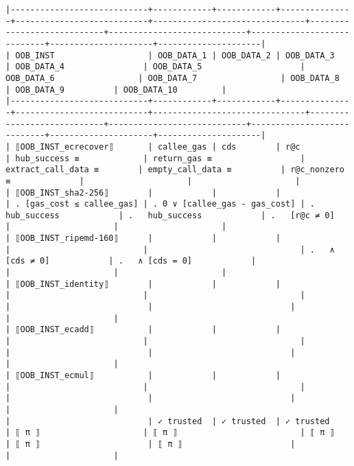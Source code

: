 \documentclass[varwidth=\maxdimen,margin=0.5cm,multi={verbatim}]{standalone}
\begin{document}
\begin{verbatim}
|----------------------------+------------+------------+---------------+---------------------------+-------------------------------+----------------------------+----------------------------+----------------------------+---------------------+---------------------|
| OOB_INST                   | OOB_DATA_1 | OOB_DATA_2 | OOB_DATA_3    | OOB_DATA_4                | OOB_DATA_5                    | OOB_DATA_6                 | OOB_DATA_7                 | OOB_DATA_8                 | OOB_DATA_9          | OOB_DATA_10         |
|----------------------------+------------+------------+---------------+---------------------------+-------------------------------+----------------------------+----------------------------+----------------------------+---------------------+---------------------|
| ⟦OOB_INST_ecrecover⟧       | callee_gas | cds        | r@c           | hub_success ≡             | return_gas ≡                  | extract_call_data ≡        | empty_call_data ≡          | r@c_nonzero ≡              |                     |                     |
| ⟦OOB_INST_sha2-256⟧        |            |            |               | . [gas_cost ≤ callee_gas] | . 0 ∨ [callee_gas - gas_cost] | .   hub_success            | .   hub_success            | .   [r@c ≠ 0]              |                     |                     |
| ⟦OOB_INST_ripemd-160⟧      |            |            |               |                           |                               | .   ∧ [cds ≠ 0]            | .   ∧ [cds = 0]            |                            |                     |                     |
| ⟦OOB_INST_identity⟧        |            |            |               |                           |                               |                            |                            |                            |                     |                     |
| ⟦OOB_INST_ecadd⟧           |            |            |               |                           |                               |                            |                            |                            |                     |                     |
| ⟦OOB_INST_ecmul⟧           |            |            |               |                           |                               |                            |                            |                            |                     |                     |
|                            | ✓ trusted  | ✓ trusted  | ✓ trusted     | ⟦ π ⟧                     | ⟦ π ⟧                         | ⟦ π ⟧                      | ⟦ π ⟧                      | ⟦ π ⟧                      |                     |                     |

\end{verbatim}
\end{document}
